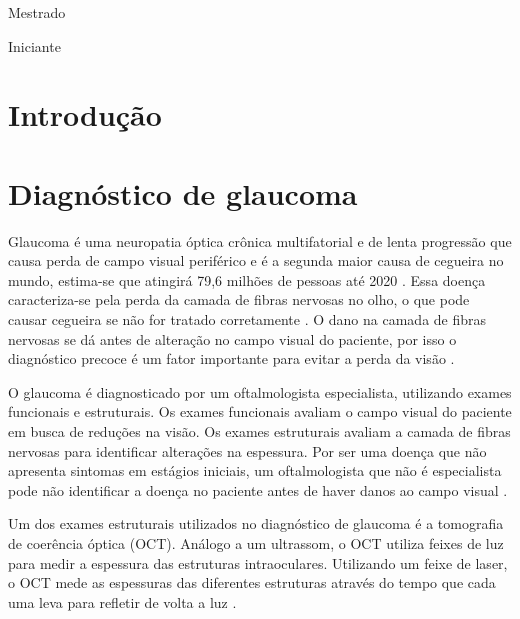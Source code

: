 \documentclass[conference]{IEEEtran}
\begin{document}
\renewcommand\IEEEkeywordsname{Classifica\c{c}\~{a}o}
\begin{IEEEkeywords}
	\label{classificacao}
	Mestrado
\end{IEEEkeywords}

\renewcommand\IEEEkeywordsname{Categoria}
\begin{IEEEkeywords}
	\label{Categoria}
	Iniciante 
\end{IEEEkeywords}

\IEEEpeerreviewmaketitle


\section{Introdução}

\section{Diagnóstico de glaucoma}


Glaucoma é uma neuropatia óptica crônica multifatorial e de lenta progressão que causa perda de campo visual periférico e é a segunda maior causa de cegueira no mundo, estima-se que atingirá 79,6 milhões de pessoas até 2020 \cite{Quigley2006}. Essa doença caracteriza-se pela perda da camada de fibras nervosas no olho, o que pode causar cegueira se não for tratado corretamente \cite{Quigley2011}. O dano na camada de fibras nervosas se dá antes de alteração no campo visual do paciente, por isso o diagnóstico precoce é um fator importante para evitar a perda da visão \cite{Malik2012}.

O glaucoma é diagnosticado por um oftalmologista especialista, utilizando exames funcionais e estruturais. Os exames funcionais avaliam o campo visual do paciente em busca de reduções na visão. Os exames estruturais avaliam a camada de fibras nervosas para identificar alterações na espessura. Por ser uma doença que não apresenta sintomas em estágios iniciais, um oftalmologista que não é especialista pode não identificar a doença no paciente antes de haver danos ao campo visual \cite{Populacoes2009}.

Um dos exames estruturais utilizados no diagnóstico de glaucoma é a tomografia de coerência óptica (OCT). Análogo a um ultrassom, o OCT utiliza feixes de luz para medir a espessura das estruturas intraoculares. Utilizando um feixe de laser, o OCT mede as espessuras das diferentes estruturas através do tempo que cada uma leva para refletir de volta a luz \cite{huang1991}.   
\end{document}
